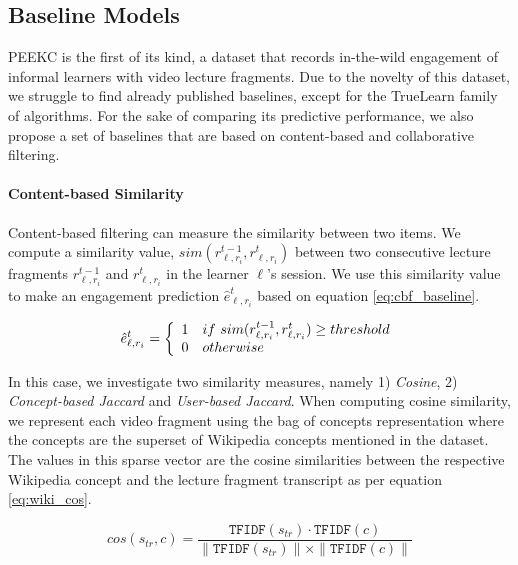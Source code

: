 \documentclass[letterpaper]{article} %
\begin{document}
\subsection{Baseline Models}

PEEKC is the first of its kind, a dataset that records in-the-wild  engagement of informal learners with video lecture fragments. Due to the novelty of this dataset, we struggle to find already published baselines, except for the TrueLearn family of algorithms.
For the sake of comparing its predictive performance,  we also propose a set of baselines that are based on content-based and collaborative filtering.

\paragraph{Content-based Similarity} Content-based filtering can measure the similarity between two items. We compute a similarity value, $sim(r^{t-1}_{\ell,r_i},r^{t}_{\ell,r_i})$ between two consecutive lecture fragments $r^{t-1}_{\ell,r_i}$ and $r^{t}_{\ell,r_i}$ in the learner  $\ell$'s session. We use this similarity value to make an engagement prediction $\hat{e}^t_{\ell,r_i}$ based on equation \ref{eq:cbf_baseline}.

\begin{equation} \label{eq:cbf_baseline}\centering
    \hat{e}^t_{\ell,r_i} =
    \left\{
      \begin{array}{ c l }
        1                 &  if\ sim(r^{t-1}_{\ell,r_i},r^{t}_{\ell,r_i}) \geq threshold \\
        0                 & otherwise
      \end{array}
    \right.
\end{equation}

In this case, we investigate two similarity measures, namely 1) \emph{Cosine}, 2) \emph{Concept-based Jaccard} and \emph{User-based Jaccard}. When computing cosine similarity, we represent each video fragment using the bag of concepts representation where the concepts are the superset of Wikipedia concepts mentioned in the dataset. The values in this sparse vector are the cosine similarities between the respective Wikipedia concept and the lecture fragment transcript as per equation \ref{eq:wiki_cos}.

\begin{equation}\label{eq:wiki_cos}
        cos(s_{tr}, c) = \frac{\texttt{TFIDF}(s_{tr}) \cdot \texttt{TFIDF}(c)}
        {\|\texttt{TFIDF}(s_{tr})\| \times \|\texttt{TFIDF}(c)\|}
\end{equation}
\end{document}
